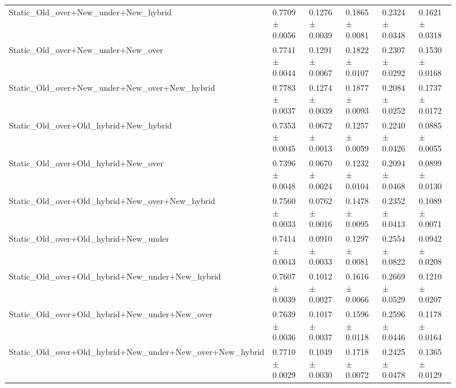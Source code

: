 \begin{longtable}{p{0.28\linewidth}p{0.12\linewidth}p{0.12\linewidth}p{0.12\linewidth}p{0.12\linewidth}p{0.12\linewidth}}
Static\_\allowbreak{}Old\_\allowbreak{}over+New\_\allowbreak{}under+New\_\allowbreak{}hybrid & 0.7709\(\pm\)0.0056 & 0.1276\(\pm\)0.0039 & 0.1865\(\pm\)0.0081 & 0.2324\(\pm\)0.0348 & 0.1621\(\pm\)0.0318 \\
Static\_\allowbreak{}Old\_\allowbreak{}over+New\_\allowbreak{}under+New\_\allowbreak{}over & 0.7741\(\pm\)0.0044 & 0.1291\(\pm\)0.0067 & 0.1822\(\pm\)0.0107 & 0.2307\(\pm\)0.0292 & 0.1530\(\pm\)0.0168 \\
Static\_\allowbreak{}Old\_\allowbreak{}over+New\_\allowbreak{}under+New\_\allowbreak{}over+New\_\allowbreak{}hybrid & 0.7783\(\pm\)0.0037 & 0.1274\(\pm\)0.0039 & 0.1877\(\pm\)0.0093 & 0.2084\(\pm\)0.0252 & 0.1737\(\pm\)0.0172 \\
Static\_\allowbreak{}Old\_\allowbreak{}over+Old\_\allowbreak{}hybrid+New\_\allowbreak{}hybrid & 0.7353\(\pm\)0.0045 & 0.0672\(\pm\)0.0013 & 0.1257\(\pm\)0.0059 & 0.2240\(\pm\)0.0426 & 0.0885\(\pm\)0.0055 \\
Static\_\allowbreak{}Old\_\allowbreak{}over+Old\_\allowbreak{}hybrid+New\_\allowbreak{}over & 0.7396\(\pm\)0.0048 & 0.0670\(\pm\)0.0024 & 0.1232\(\pm\)0.0104 & 0.2094\(\pm\)0.0468 & 0.0899\(\pm\)0.0130 \\
Static\_\allowbreak{}Old\_\allowbreak{}over+Old\_\allowbreak{}hybrid+New\_\allowbreak{}over+New\_\allowbreak{}hybrid & 0.7560\(\pm\)0.0033 & 0.0762\(\pm\)0.0016 & 0.1478\(\pm\)0.0095 & 0.2352\(\pm\)0.0413 & 0.1089\(\pm\)0.0071 \\
Static\_\allowbreak{}Old\_\allowbreak{}over+Old\_\allowbreak{}hybrid+New\_\allowbreak{}under & 0.7414\(\pm\)0.0043 & 0.0910\(\pm\)0.0033 & 0.1297\(\pm\)0.0081 & 0.2554\(\pm\)0.0822 & 0.0942\(\pm\)0.0208 \\
Static\_\allowbreak{}Old\_\allowbreak{}over+Old\_\allowbreak{}hybrid+New\_\allowbreak{}under+New\_\allowbreak{}hybrid & 0.7607\(\pm\)0.0039 & 0.1012\(\pm\)0.0027 & 0.1616\(\pm\)0.0066 & 0.2669\(\pm\)0.0529 & 0.1210\(\pm\)0.0207 \\
Static\_\allowbreak{}Old\_\allowbreak{}over+Old\_\allowbreak{}hybrid+New\_\allowbreak{}under+New\_\allowbreak{}over & 0.7639\(\pm\)0.0036 & 0.1017\(\pm\)0.0037 & 0.1596\(\pm\)0.0118 & 0.2596\(\pm\)0.0446 & 0.1178\(\pm\)0.0164 \\
Static\_\allowbreak{}Old\_\allowbreak{}over+Old\_\allowbreak{}hybrid+New\_\allowbreak{}under+New\_\allowbreak{}over+New\_\allowbreak{}hybrid & 0.7710\(\pm\)0.0029 & 0.1049\(\pm\)0.0030 & 0.1718\(\pm\)0.0072 & 0.2425\(\pm\)0.0478 & 0.1365\(\pm\)0.0129 \\

\end{longtable}

